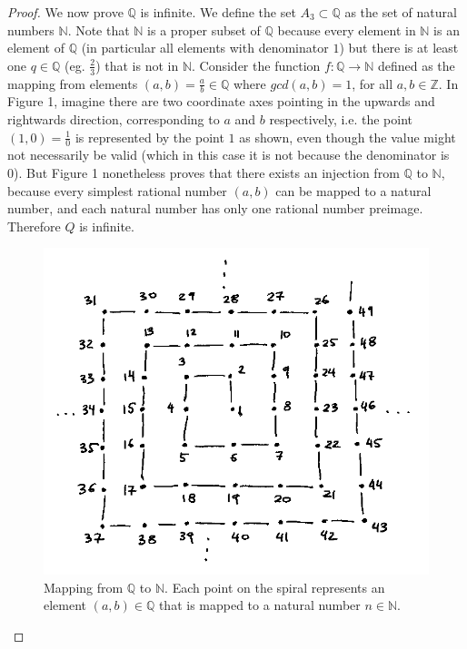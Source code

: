\documentclass[11pt,twoside, reqno, align]{amsart}
\theoremstyle{remark}
\def\Q{\mathbb Q}
\def\N{\mathbb N}
\def\Z{\mathbb Z}
\begin{document}
\begin{proof}
We now prove $\Q$ is infinite. We define the set $A_3 \subset \Q$ as the set of natural numbers $\N$. Note that $\N$ is a proper subset of $\Q$ because every element in $\N$ is an element of $\Q$ (in particular all elements with denominator $1$) but there is at least one $q \in \Q$ (eg. $\frac{2}{3}$) that is not in $\N$. Consider the function $f:\Q \to \N$ defined as the mapping from elements $(a,b) = \frac{a}{b} \in \Q$ where $gcd(a,b) = 1$, for all $a,b \in \Z$. In Figure 1, imagine there are two coordinate axes pointing in the upwards and rightwards direction, corresponding to $a$ and $b$ respectively, i.e. the point $(1,0) = \frac{1}{0}$ is represented by the point $1$ as shown, even though the value might not necessarily be valid (which in this case it is not because the denominator is 0). But Figure 1 nonetheless proves that there exists an injection from $\Q$ to $\N$, because every simplest rational number $(a,b)$ can be mapped to a natural number, and each natural number has only one rational number preimage. Therefore $Q$ is infinite.
\begin{figure}
    \centering
    \includegraphics{QtoN.png}
    \caption{Mapping from $\Q$ to $\N$. Each point on the spiral represents an element $(a,b) \in \Q$ that is mapped to a natural number $n \in \N$.}
    \label{fig:my_label}
\end{figure}

\end{proof}
\end{document}

